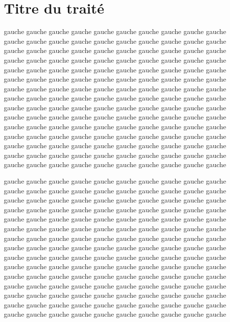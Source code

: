 \documentclass[openany]{book}
\begin{document}
\part*{Titre du traité}

\begin{pages}

\begin{Leftside}
  \beginnumbering

\pstart
%
gauche gauche gauche gauche gauche gauche gauche gauche gauche gauche
gauche gauche gauche gauche gauche gauche gauche gauche gauche gauche
gauche gauche gauche gauche gauche gauche gauche gauche gauche gauche
gauche gauche gauche gauche gauche gauche gauche gauche gauche gauche
gauche gauche gauche gauche gauche gauche gauche gauche gauche gauche
gauche gauche gauche gauche gauche gauche gauche gauche gauche gauche
gauche gauche gauche gauche gauche gauche gauche gauche gauche gauche
gauche gauche gauche gauche gauche gauche gauche gauche gauche gauche
gauche gauche gauche gauche gauche gauche gauche gauche gauche gauche
gauche gauche gauche gauche gauche gauche gauche gauche gauche gauche
gauche gauche gauche gauche gauche gauche gauche gauche gauche gauche
gauche gauche gauche gauche gauche gauche gauche gauche gauche gauche
gauche gauche gauche gauche gauche gauche gauche gauche gauche gauche
gauche gauche gauche gauche gauche gauche gauche gauche gauche gauche
gauche gauche gauche gauche gauche gauche gauche gauche gauche gauche
%
\pend

\pstart
%
gauche gauche gauche gauche gauche gauche gauche gauche gauche gauche
gauche gauche gauche gauche gauche gauche gauche gauche gauche gauche
gauche gauche gauche gauche gauche gauche gauche gauche gauche gauche
gauche gauche gauche gauche gauche gauche gauche gauche gauche gauche
gauche gauche gauche gauche gauche gauche gauche gauche gauche gauche
gauche gauche gauche gauche gauche gauche gauche gauche gauche gauche
gauche gauche gauche gauche gauche gauche gauche gauche gauche gauche
gauche gauche gauche gauche gauche gauche gauche gauche gauche gauche
gauche gauche gauche gauche gauche gauche gauche gauche gauche gauche
gauche gauche gauche gauche gauche gauche gauche gauche gauche gauche
gauche gauche gauche gauche gauche gauche gauche gauche gauche gauche
gauche gauche gauche gauche gauche gauche gauche gauche gauche gauche
gauche gauche gauche gauche gauche gauche gauche gauche gauche gauche
gauche gauche gauche gauche gauche gauche gauche gauche gauche gauche
gauche gauche gauche gauche gauche gauche gauche gauche gauche gauche
%
\pend


\end{Leftside}
\end{pages}
\end{document}
